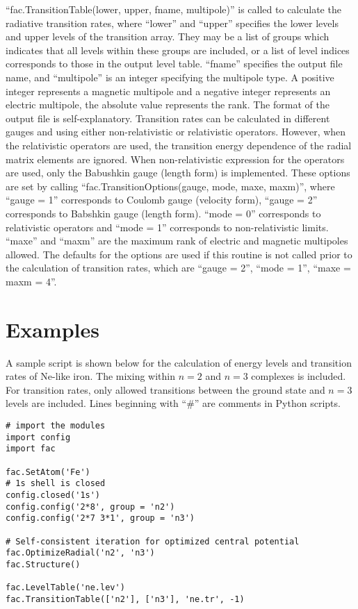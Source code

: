 \documentclass{elsart}
\begin{document}
``fac.TransitionTable(lower, upper, fname, multipole)'' is called to calculate
the radiative transition rates, where ``lower'' and
``upper'' specifies the lower levels and upper levels of the transition
array. They may be a list of groups which indicates that all levels within
these groups are included, or a list of level indices corresponds to those in
the output level table. ``fname'' specifies the output file name, and
``multipole'' is an integer specifying the multipole type. A positive integer
represents a magnetic multipole and a negative integer represents an electric
multipole, the absolute value represents the rank. The format of the output
file is self-explanatory. Transition rates can be calculated in different
gauges and using either non-relativistic or relativistic operators. However,
when the relativistic operators are used, the transition energy dependence of
the radial matrix elements are ignored. When non-relativistic expression for
the operators are used, only the Babushkin gauge (length form) is
implemented. These options are set by calling ``fac.TransitionOptions(gauge,
mode, maxe, maxm)'', where ``gauge = 1'' corresponds to Coulomb gauge
(velocity form), ``gauge = 2'' corresponds to Babshkin gauge (length
form). ``mode = 0'' corresponds to relativistic operators and ``mode = 1''
corresponds to non-relativistic limits. ``maxe'' and ``maxm'' are the maximum
rank of electric and magnetic multipoles allowed. The defaults for the options
are used if this routine is not called prior to the calculation of transition
rates, which are ``gauge = 2'', ``mode = 1'', ``maxe = maxm = 4''.

\section{Examples}
\label{sec_example}
A sample script is shown below for the calculation of energy levels and
transition rates of Ne-like iron. The mixing within $n = 2$ and $n = 3$
complexes is included. For transition rates, only allowed transitions between
the ground state and $n = 3$ levels are included. Lines beginning with ``\#''
are comments in Python scripts.
\begin{verbatim}
# import the modules
import config
import fac

fac.SetAtom('Fe')
# 1s shell is closed
config.closed('1s')
config.config('2*8', group = 'n2')
config.config('2*7 3*1', group = 'n3')

# Self-consistent iteration for optimized central potential
fac.OptimizeRadial('n2', 'n3')
fac.Structure()

fac.LevelTable('ne.lev')
fac.TransitionTable(['n2'], ['n3'], 'ne.tr', -1)
\end{verbatim}
\end{document}
